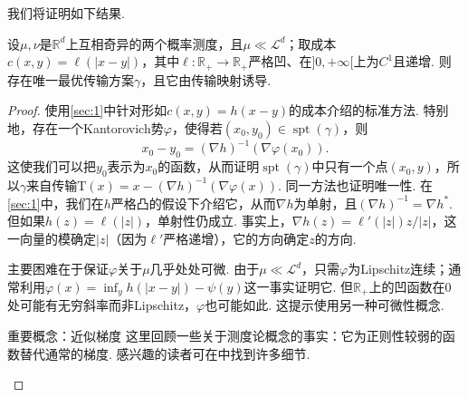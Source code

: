 我们将证明如下结果.
\begin{theorem}\label{obj:3.26}
设$\mu,\nu$是$\mathbb R^d$上互相奇异的两个概率测度，且$\mu\ll\mathscr L^d$；取成本$c(x,y)=\ell(|x-y|)$，其中$\ell:\mathbb R_+\to\mathbb R_+$严格凹、在$]0,+\infty[$上为$C^1$且递增. 则存在唯一最优传输方案$\gamma$，且它由传输映射诱导.
\end{theorem}
\begin{proof}
使用\autoref{sec:1}中针对形如$c(x,y)=h(x-y)$的成本介绍的标准方法. 特别地，存在一个Kantorovich势$\varphi$，使得若$(x_0,y_0)\in\operatorname{spt}(\gamma)$，则
\begin{equation}\label{eq:3.8}
x_0-y_0=(\nabla h)^{-1}(\nabla\varphi(x_0)).
\end{equation}
这使我们可以把$y_0$表示为$x_0$的函数，从而证明$\operatorname{spt}(\gamma)$中只有一个点$(x_0,y)$，所以$\gamma$来自传输$\mathrm T(x)=x-(\nabla h)^{-1}(\nabla\varphi(x))$. 同一方法也证明唯一性. 在\autoref{sec:1}中，我们在$h$严格凸的假设下介绍它，从而$\nabla h$为单射，且$(\nabla h)^{-1}=\nabla h^*$. 但如果$h(z)=\ell(|z|)$，单射性仍成立. 事实上，$\nabla h(z)=\ell'(|z|)z/|z|$，这一向量的模确定$|z|$（因为$\ell'$严格递增），它的方向确定$z$的方向.

主要困难在于保证$\varphi$关于$\mu$几乎处处可微. 由于$\mu\ll\mathscr L^d$，只需$\varphi$为Lipschitz连续；通常利用$\varphi(x)=\inf_yh(|x-y|)-\psi(y)$这一事实证明它. 但$\mathbb R_+$上的凹函数在$0$处可能有无穷斜率而非Lipschitz，$\varphi$也可能如此. 这提示使用另一种可微性概念.

\begin{sourcebox}{重要概念：近似梯度}\label{box:3.3}
这里回顾一些关于测度论概念的事实：它为正则性较弱的函数替代通常的梯度. 感兴趣的读者可在\cite{b160}中找到许多细节.


\end{sourcebox}
\end{proof}
